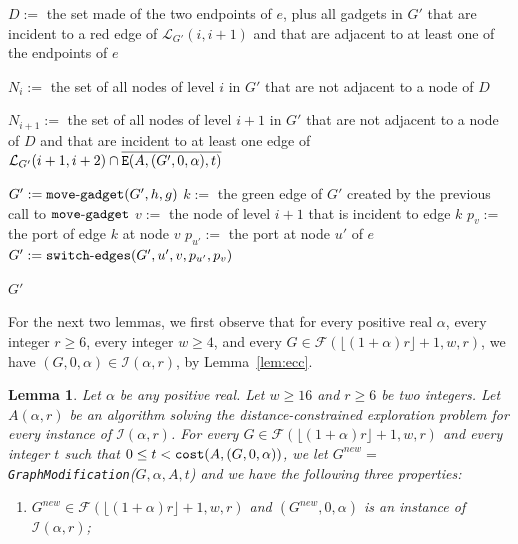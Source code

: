 \documentclass[11pt]{article}
\newtheorem{lemma}{Lemma}[section]
\begin{document}
{\begin{algorithm}[H]
{{$D :=$ the set made of the two endpoints of $e$, plus all gadgets in $G'$ that are incident to a red edge of $\mathcal{L}_{G'}(i,i+1)$ and that are adjacent to at least one of the endpoints of $e$\;\label{llllll}
                
$N_i :=$ the set of all nodes of level $i$ in $G'$ that are not adjacent to a node of $D$\;

$N_{i+1} :=$ the set of all nodes of level $i+1$ in $G'$ that are not adjacent to a node of $D$ and that are incident to at least one edge of $\mathcal{L}_{G'}(i+1,i+2)\cap\overline{{\tt E}(A,(G',0,\alpha),t)}$\;

{
$G' := {\tt move\mbox{-}gadget}(G',h,g)$\;\label{ligne:modif:4} 
$k :=$ the green edge of $G'$ created by the previous call to ${\tt move\mbox{-}gadget}$\;\label{ligne:yoyo} \label{ligne:18}
$v :=$ the node of level $i+1$ that is incident to edge $k$\;
$p_{v} :=$ the port of edge $k$ at node $v$\;
$p_{u'} :=$ the port at node $u'$ of $e$\;
$G' := {\tt switch\mbox{-}edges}(G',u',v,p_{u'},p_v)$\;\label{ligne:modif:3}
  }
	}
}
\Return $G'$\;\label{ligne:fin}\label{ligne:23}
\end{algorithm}


For the next two lemmas, we first observe that for every positive real
$\alpha$, every integer $r \geq 6$, every integer $w\geq 4$, and every
$G \in \mathcal{F}(\lfloor(1+\alpha)r\rfloor+1,w,r)$, we have
$(G,0,\alpha) \in \mathcal{I}(\alpha,r)$, by Lemma~\ref{lem:ecc}. 

\begin{lemma}
  \label{lem:adv1}
  Let $\alpha$ be any positive real. Let $w \geq 16$ and $r\geq 6$ be
  two integers.
  Let $A(\alpha,r)$ be an algorithm solving the
  distance-constrained exploration problem for every instance of
  $\mathcal{I}(\alpha,r)$.
  For every $G\in\mathcal{F}(\lfloor(1+\alpha)r\rfloor+1,w,r)$ and every integer $t$ such that $0\leq t < {\tt
    cost}(A,(G,0,\alpha))$, we let $G^{new} = $ {\tt GraphModification}($G,\alpha,A,t$) and we have the following
  three properties:
\begin{enumerate}

\item $G^{new}\in\mathcal{F}(\lfloor(1+\alpha)r\rfloor+1,w,r)$ and
  $(G^{new},0,\alpha)$ is an instance of $\mathcal{I}(\alpha,r)$;
  

\end{enumerate}
\end{lemma}}
\end{document}
